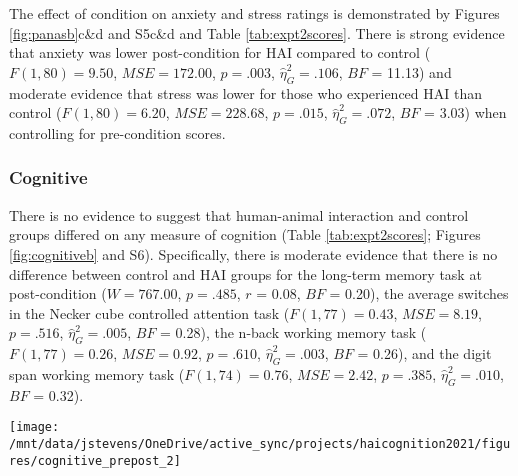\documentclass[
  english,
  pub,floatsintext]{apa6}
\begin{document}
The effect of condition on anxiety and stress ratings is demonstrated by Figures \ref{fig:panasb}c\&d and S5c\&d and Table \ref{tab:expt2scores}. There is strong evidence that anxiety was lower post-condition for HAI compared to control (\(F(1, 80) = 9.50\), \(\mathit{MSE} = 172.00\), \(p = .003\), \(\hat{\eta}^2_G = .106\), \(BF\) = 11.13) and moderate evidence that stress was lower for those who experienced HAI than control (\(F(1, 80) = 6.20\), \(\mathit{MSE} = 228.68\), \(p = .015\), \(\hat{\eta}^2_G = .072\), \(BF\) = 3.03) when controlling for pre-condition scores.

\hypertarget{cognitive}{%
\subsubsection{Cognitive}\label{cognitive}}

There is no evidence to suggest that human-animal interaction and control groups differed on any measure of cognition (Table \ref{tab:expt2scores}; Figures \ref{fig:cognitiveb} and S6). Specifically, there is moderate evidence that there is no difference between control and HAI groups for the long-term memory task at post-condition (\(W = 767.00\), \(p = .485\), \(r\) = 0.08, \(BF\) = 0.20), the average switches in the Necker cube controlled attention task (\(F(1, 77) = 0.43\), \(\mathit{MSE} = 8.19\), \(p = .516\), \(\hat{\eta}^2_G = .005\), \(BF\) = 0.28), the n-back working memory task (\(F(1, 77) = 0.26\), \(\mathit{MSE} = 0.92\), \(p = .610\), \(\hat{\eta}^2_G = .003\), \(BF\) = 0.26), and the digit span working memory task (\(F(1, 74) = 0.76\), \(\mathit{MSE} = 2.42\), \(p = .385\), \(\hat{\eta}^2_G = .010\), \(BF\) = 0.32).



\begin{figure*}
\texttt{[image: /mnt/data/jstevens/OneDrive/active\_sync/projects/haicognition2021/figures/cognitive\_prepost\_2]} \caption{Cognitive performance for control and HAI (human-animal interaction) groups in Experiment 2. (a) Long-term memory accuracy from the Deese-Roedinger-McDermott task was calculated only post-condition. Pre- (Pre) and post-condition (Post) performance was calculated for (b) the difference in number of attentional shifts between the two Necker cube trials, (c) the index for the backwards digit span task, and (d) \(d'\) for the n-back task. Open triangles (blue) represent individual control participant scores, open circles (orange) represent individual HAI participant scores, closed triangles and circles represent condition group means (with lines connecting condition means), error bars represent 95\% confidence intervals.}\label{fig:cognitiveb}
\end{figure*}
\end{document}
